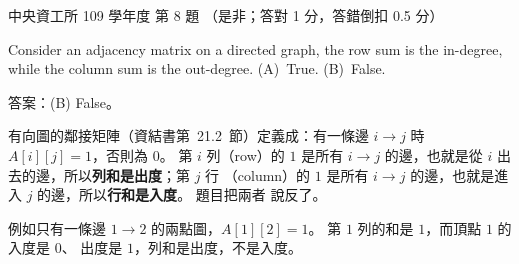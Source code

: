 \begin{pastexam}[label={px:ncu-109-dsa-08}]{中央資工所 109 學年度 第 8 題}
（是非；答對 1 分，答錯倒扣 0.5 分）

Consider an adjacency matrix on a directed graph, the row sum is the in-degree, while the column
sum is the out-degree. \qquad (A)~True. \qquad (B)~False.
\end{pastexam}

\begin{pastsoln}
答案：(B) False。

有向圖的鄰接矩陣（資結書第~21.2~節）定義成：有一條邊 $i \to j$ 時 $A[i][j] = 1$，否則為 $0$。 第 $i$
列（row）的 $1$ 是所有 $i \to j$ 的邊，也就是從 $i$ 出去的邊，所以\textbf{列和是出度}；第 $j$ 行
（column）的 $1$ 是所有 $i \to j$ 的邊，也就是進入 $j$ 的邊，所以\textbf{行和是入度}。 題目把兩者
說反了。

例如只有一條邊 $1 \to 2$ 的兩點圖，$A[1][2] = 1$。 第 $1$ 列的和是 $1$，而頂點 $1$ 的入度是 $0$、
出度是 $1$，列和是出度，不是入度。
\end{pastsoln}
